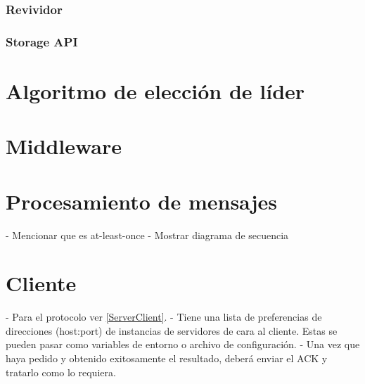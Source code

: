 \documentclass[titlepage,a4paper,oneside]{article}
\begin{document}
\subsubsection{Revividor}

\subsubsection{Storage API}

\section{Algoritmo de elección de líder}

\section{Middleware}

\section{Procesamiento de mensajes}
- Mencionar que es at-least-once
- Mostrar diagrama de secuencia

\section{Cliente}
- Para el protocolo ver \ref{ServerClient}.
- Tiene una lista de preferencias de direcciones (host:port) de instancias de servidores de cara al cliente. Estas se pueden pasar como variables de entorno o archivo de configuración.
- Una vez que haya pedido y obtenido exitosamente el resultado, deberá enviar el ACK y tratarlo como lo requiera.

\printbibliography
\end{document}
